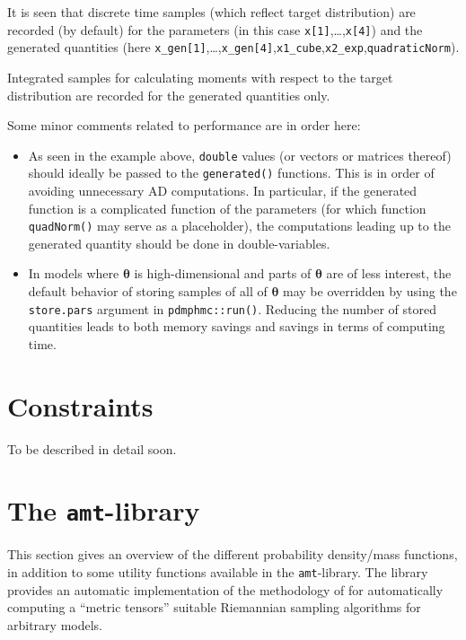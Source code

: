 \documentclass[
]{book}
\begin{document}
It is seen that discrete time samples (which reflect target distribution) are recorded (by default) for the parameters (in this case \texttt{x{[}1{]}},\ldots,\texttt{x{[}4{]}}) and the generated quantities (here \texttt{x\_gen{[}1{]}},\ldots,\texttt{x\_gen{[}4{]}},\texttt{x1\_cube},\texttt{x2\_exp},\texttt{quadraticNorm}).

Integrated samples for calculating moments with respect to the target distribution are recorded for the generated quantities only.

Some minor comments related to performance are in order here:

\begin{itemize}
\item
  As seen in the example above, \texttt{double} values (or vectors or matrices thereof) should ideally be passed to the \texttt{generated()} functions. This is in order of avoiding unnecessary AD computations. In particular, if the generated function is a complicated function of the parameters (for which function \texttt{quadNorm()} may serve as a placeholder), the computations leading up to the generated quantity should be done in double-variables.
\item
  In models where \(\boldsymbol \theta\) is high-dimensional and parts of \(\boldsymbol \theta\) are of less interest, the default behavior of storing samples of all of \(\boldsymbol \theta\) may be overridden by using the \texttt{store.pars} argument in \texttt{pdmphmc::run()}. Reducing the number of stored quantities leads to both memory savings and savings in terms of computing time.
\end{itemize}

\hypertarget{constraints}{%
\chapter{Constraints}\label{constraints}}

To be described in detail soon.

\hypertarget{amt-lib}{%
\chapter{\texorpdfstring{The \texttt{amt}-library}{The amt-library}}\label{amt-lib}}

This section gives an overview of the different probability density/mass functions, in addition to some utility functions available in the \texttt{amt}-library. The library provides an automatic
implementation of the methodology of \citet{kleppe_amt} for automatically computing a ``metric tensors'' suitable Riemannian sampling algorithms for arbitrary models.
\end{document}
